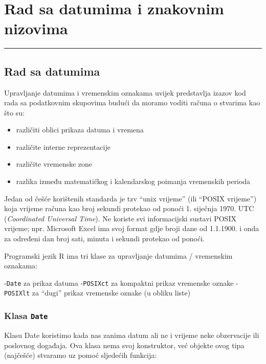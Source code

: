\documentclass[]{book}
\providecommand{\tightlist}{%
  \setlength{\itemsep}{0pt}\setlength{\parskip}{0pt}}
\theoremstyle{definition}
\theoremstyle{definition}
\theoremstyle{definition}
\theoremstyle{remark}
\begin{document}
\chapter{Rad sa datumima i znakovnim nizovima}\label{datumi}

\begin{center}\rule{0.5\linewidth}{\linethickness}\end{center}

\section{Rad sa datumima}\label{rad-sa-datumima}

Upravljanje datumima i vremenskim oznakama uvijek predstavlja izazov kod
rada sa podatkovnim skupovima budući da moramo voditi računa o stvarima
kao što su:

\begin{itemize}
\tightlist
\item
  različiti oblici prikaza datuma i vremena
\item
  različite interne reprezentacije
\item
  različite vremenske zone
\item
  razlika između matematičkog i kalendarskog poimanja vremenskih perioda
\end{itemize}

Jedan od češće korištenih standarda je tzv ``unix vrijeme'' (ili ``POSIX
vrijeme'') koja vrijeme računa kao broj sekundi protekao od ponoći 1.
siječnja 1970. UTC (\emph{Coordinated Universal Time}). Ne koriste svi
informacijski sustavi POSIX vrijeme; npr. Microsoft Excel ima svoj
format gdje broji dane od 1.1.1900. i onda za određeni dan broj sati,
minuta i sekundi protekao od ponoći.

Programski jezik R ima tri klase za upravljanje datumima / vremenskim
oznakama:

-\texttt{Date} za prikaz datuma -\texttt{POSIXct} za kompaktni prikaz
vremenske oznake - \texttt{POSIXlt} za ``dugi'' prikaz vremenske oznake
(u obliku liste)

\subsection{\texorpdfstring{Klasa
\texttt{Date}}{Klasa Date}}\label{klasa-date}

Klasu Date koristimo kada nas zanima datum ali ne i vrijeme neke
obzervacije ili poslovnog događaja. Ova klasa nema svoj konstruktor, već
objekte ovog tipa (najčešće) stvaramo uz pomoć sljedećih funkcija:
\end{document}

